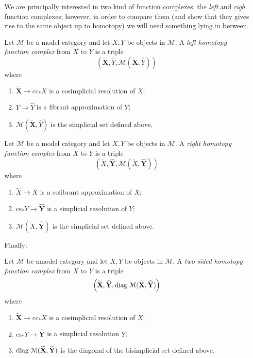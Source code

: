 \begin{refsection}
We are principally interested in two kind of function complexes: the \emph{left} and \emph{righ} function complexes; however, in order to compare them (and show that they gives rise to the same object up to homotopy) we will need something lying in between.

\begin{defin}
Let $\mathcal M$ be a model category and let $X,Y$ be objects in $\mathcal M$. A \emph{left homotopy function complex} from $X$ to $Y$ is a triple
\[
\left( \widetilde{\mathbf X}, \widehat{Y}, \mathcal M( \widetilde{\mathbf X}, \widehat{Y}) \right)
\]
where
\begin{enumerate}
\item $\widetilde{\mathbf X} \to \mathrm{cc}_* X$ is a cosimplicial resolution of $X$;
\item $Y \to \widehat{Y}$ is a fibrant approximation of $Y$;
\item $\mathcal M(\widetilde{\mathbf X}, \widehat{Y})$ is the simplicial set defined above.
\end{enumerate}
\end{defin}

\begin{defin}
Let $\mathcal M$ be a model category and let $X,Y$ be objects in $\mathcal M$. A \emph{right homotopy function complex} from $X$ to $Y$ is a triple
\[
\left( \widetilde{X}, \widehat{\mathbf Y}, \mathcal M(\widetilde{X}, \widehat{\mathbf Y}) \right)
\]
where
\begin{enumerate}
\item $\widetilde{X} \to X$ is a cofibrant approximation of $X$;
\item $\mathrm{cs}_* Y \to \widehat{\mathbf Y}$ is a simplicial resolution of $Y$;
\item $\mathcal M(\widetilde{X}, \widehat{\mathbf Y})$ is the simplicial set defined above.
\end{enumerate}
\end{defin}

Finally:

\begin{defin}
Let $\mathcal M$ be amodel category and let $X,Y$ be objects in $\mathcal M$. A \emph{two-sided homotopy function complex} from $X$ to $Y$ is a triple
\[
\left( \widetilde{\mathbf X}, \widehat{\mathbf Y}, \operatorname{\mathrm{diag} \,} \mathcal M(\widetilde{\mathbf X}, \widehat{\mathbf Y}) \right)
\]
where
\begin{enumerate}
\item $\widetilde{\mathbf X} \to \mathrm{cc}_* X$ is a cosimplicial resolution of $X$;
\item $\mathrm{cs}_* Y \to \widehat{\mathbf Y}$ is a simplicial resolution $Y$;
\item $\operatorname{\mathrm{diag} \,} \mathcal M(\widetilde{\mathbf X}, \widehat{\mathbf Y})$ is the diagonal of the bisimplicial set defined above.
\end{enumerate}
\end{defin}


\end{refsection}
